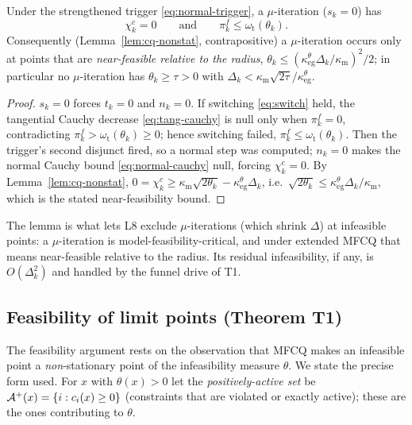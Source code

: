 \begin{lemma}
  \label{lem:mu-critical}
  Under the strengthened trigger \eqref{eq:normal-trigger}, a $\mu$-iteration
  ($s_k=0$) has
  \[
    \chi_k^c=0 \qquad\text{and}\qquad \pi_k^f\le\omega_{\mathrm t}(\theta_k).
  \]
  Consequently (Lemma~\ref{lem:cq-nonstat}, contrapositive) a $\mu$-iteration occurs
  only at points that are \emph{near-feasible relative to the radius},
  $\theta_k\le(\kappa_{\mathrm{eg}}^\theta\Delta_k/\kappa_{\mathrm m})^2/2$; in
  particular no $\mu$-iteration has $\theta_k\ge\tau>0$ with
  $\Delta_k<\kappa_{\mathrm m}\sqrt{2\tau}/\kappa_{\mathrm{eg}}^\theta$.
\end{lemma}
\begin{proof}
  $s_k=0$ forces $t_k=0$ and $n_k=0$. If switching \eqref{eq:switch} held, the
  tangential Cauchy decrease \eqref{eq:tang-cauchy} is null only when $\pi_k^f=0$,
  contradicting $\pi_k^f>\omega_{\mathrm t}(\theta_k)\ge0$; hence switching failed,
  $\pi_k^f\le\omega_{\mathrm t}(\theta_k)$. Then the trigger's second disjunct fired,
  so a normal step was computed; $n_k=0$ makes the normal Cauchy bound
  \eqref{eq:normal-cauchy} null, forcing $\chi_k^c=0$. By
  Lemma~\ref{lem:cq-nonstat}, $0=\chi_k^c\ge\kappa_{\mathrm m}\sqrt{2\theta_k}-\kappa_{\mathrm{eg}}^\theta\Delta_k$,
  i.e.\ $\sqrt{2\theta_k}\le\kappa_{\mathrm{eg}}^\theta\Delta_k/\kappa_{\mathrm m}$, which
  is the stated near-feasibility bound.
\end{proof}

\noindent The lemma is what lets L8 exclude $\mu$-iterations (which shrink $\Delta$)
at infeasible points: a $\mu$-iteration is model-feasibility-critical, and under
extended MFCQ that means near-feasible relative to the radius. Its residual
infeasibility, if any, is $O(\Delta_k^2)$ and handled by the funnel drive of T1.

\subsection{Feasibility of limit points (Theorem T1)}
\label{sec:T1}

The feasibility argument rests on the observation that MFCQ makes an infeasible
point a \emph{non}-stationary point of the infeasibility measure $\theta$. We
state the precise form used. For $x$ with $\theta(x)>0$ let the
\emph{positively-active set} be $\mathcal{A}^+(x)=\{i:c_i(x)\ge0\}$ (constraints that are
violated or exactly active); these are the ones contributing to $\theta$.

